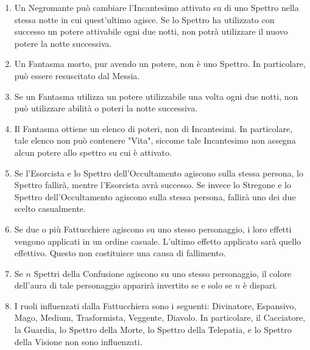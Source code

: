 \documentclass[a4paper,10pt]{article}
\begin{document}
\begin{enumerate}
	\item Un Negromante può cambiare l'Incantesimo attivato su di uno Spettro nella stessa notte in cui quest'ultimo agisce. Se lo Spettro ha utilizzato con successo un potere attivabile ogni due notti, non potrà utilizzare il nuovo potere la notte successiva.

	\item Un Fantasma morto, pur avendo un potere, non è uno Spettro. In particolare, può essere resuscitato dal Messia.

	\item Se un Fantasma utilizza un potere utilizzabile una volta ogni due notti, non può utilizzare abilità o poteri la notte successiva.

	\item Il Fantasma ottiene un elenco di poteri, non di Incantesimi. In particolare, tale elenco non può contenere "Vita", siccome tale Incantesimo non assegna alcun potere allo spettro su cui è attivato.

	\item Se l'Esorcista e lo Spettro dell'Occultamento agiscono sulla stessa persona, lo Spettro fallirà, mentre l'Esorcista avrà successo. Se invece lo Stregone e lo Spettro dell'Occultamento agiscono sulla stessa persona, fallirà uno dei due scelto casualmente.

	\item Se due o più Fattucchiere agiscono su uno stesso personaggio, i loro effetti vengono applicati in un ordine casuale. L'ultimo effetto applicato sarà quello effettivo. Questo non costituisce una causa di fallimento.

	\item Se $n$ Spettri della Confusione agiscono su uno stesso personaggio, il colore dell'aura di tale personaggio apparirà invertito se e solo se $n$ è dispari.

	\item I ruoli influenzati dalla Fattucchiera sono i seguenti: Divinatore, Espansivo, Mago, Medium, Trasformista, Veggente, Diavolo. In particolare, il Cacciatore, la Guardia, lo Spettro della Morte, lo Spettro della Telepatia, e lo Spettro della Visione non sono influenzati.


\end{enumerate}
\end{document}
